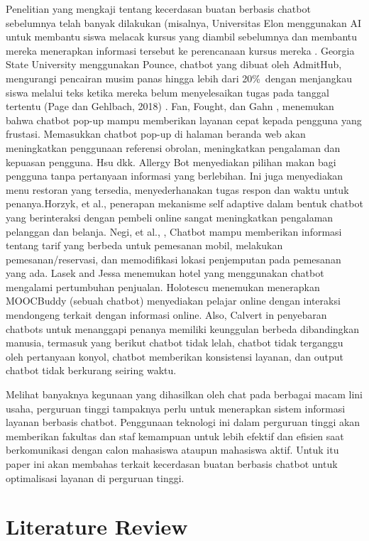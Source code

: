 \documentclass[conference]{IEEEtran}
\begin{document}
Penelitian yang mengkaji tentang kecerdasan buatan berbasis chatbot sebelumnya telah banyak dilakukan (misalnya, Universitas Elon menggunakan AI untuk membantu siswa melacak kursus yang diambil sebelumnya dan membantu mereka menerapkan informasi tersebut ke perencanaan kursus mereka \cite{b4}. Georgia State University menggunakan Pounce, chatbot yang dibuat oleh AdmitHub, mengurangi pencairan musim panas hingga lebih dari 20\%\ dengan menjangkau siswa melalui teks ketika mereka belum menyelesaikan tugas pada tanggal tertentu (Page dan Gehlbach, 2018) \cite{b5}. Fan, Fought, dan Gahn \cite{b6}, menemukan bahwa chatbot pop-up mampu memberikan layanan cepat kepada pengguna yang frustasi. Memasukkan chatbot pop-up di halaman beranda web akan meningkatkan penggunaan referensi obrolan, meningkatkan pengalaman dan kepuasan pengguna. Hsu dkk. \cite{b7} Allergy Bot menyediakan pilihan makan bagi pengguna tanpa pertanyaan informasi yang berlebihan. Ini juga menyediakan menu restoran yang tersedia, menyederhanakan tugas respon dan waktu untuk penanya.Horzyk, et al.,  \cite{b8}  penerapan mekanisme self adaptive dalam bentuk chatbot yang berinteraksi dengan pembeli online sangat meningkatkan pengalaman pelanggan dan belanja. Negi, et al., \cite{b9}, Chatbot mampu memberikan informasi tentang tarif yang berbeda untuk pemesanan mobil, melakukan pemesanan/reservasi, dan memodifikasi lokasi penjemputan pada pemesanan yang ada. Lasek and Jessa \cite{b10} menemukan hotel yang menggunakan chatbot mengalami pertumbuhan penjualan. Holotescu \cite{b11} menemukan menerapkan MOOCBuddy (sebuah chatbot) menyediakan pelajar online dengan interaksi mendongeng terkait dengan informasi online. Also, Calvert in \cite{b12} penyebaran chatbots untuk menanggapi penanya memiliki keunggulan berbeda dibandingkan manusia, termasuk yang berikut chatbot tidak lelah, chatbot tidak terganggu oleh pertanyaan konyol, chatbot memberikan konsistensi layanan, dan output chatbot tidak berkurang seiring waktu. 

Melihat banyaknya kegunaan yang dihasilkan oleh chat pada berbagai macam lini usaha, perguruan tinggi tampaknya perlu untuk menerapkan sistem informasi layanan berbasis chatbot. Penggunaan teknologi ini dalam perguruan tinggi akan memberikan fakultas dan staf kemampuan untuk lebih efektif dan efisien saat berkomunikasi dengan calon mahasiswa ataupun mahasiswa aktif. Untuk itu paper ini akan membahas terkait kecerdasan buatan berbasis chatbot untuk optimalisasi layanan di perguruan tinggi.

\section{Literature Review}
\end{document}
